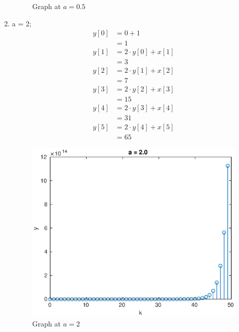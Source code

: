 \documentclass{article}
\begin{document}
\begin{multicols*}{2}
\begin{enumerate}
\begin{figure}[H]
                     \caption{Graph at \(a=0.5\)}
                \end{figure}
          \item a = 2; \begin{align*}
                     y[0] & = 0 + 1               \\
                          & = 1                   \\
                     y[1] & = 2 \cdot y[0] + x[1] \\
                          & = 3                   \\
                     y[2] & = 2 \cdot y[1] + x[2] \\
                          & = 7                   \\
                     y[3] & = 2 \cdot y[2] + x[3] \\
                          & = 15                  \\
                     y[4] & = 2 \cdot y[3] + x[4] \\
                          & = 31                  \\
                     y[5] & = 2 \cdot y[4] + x[5] \\
                          & = 65
                \end{align*}
                \begin{figure}[H]
                     \centering
                     \includegraphics[width=\linewidth]{a2}
                     \caption{Graph at \(a=2\)}

\end{figure}
\end{enumerate}
\end{multicols*}
\end{document}
